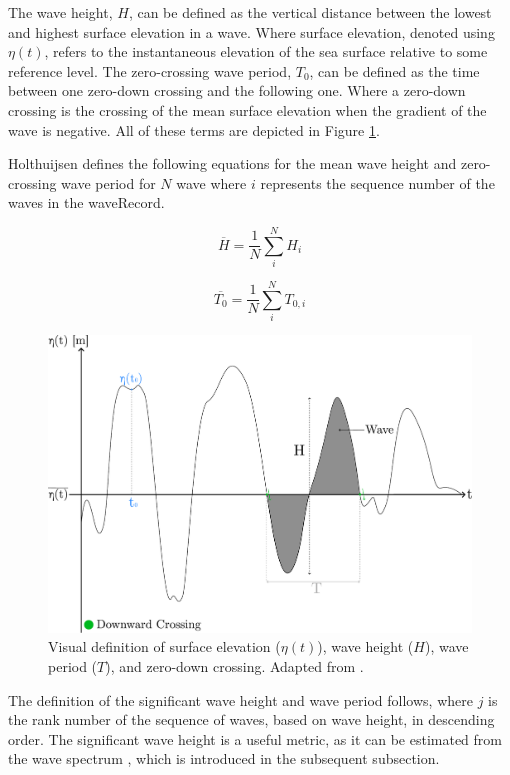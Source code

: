 The wave height, $H$, can be defined as the vertical distance between the lowest and highest surface elevation in a wave. Where surface elevation, denoted using $\eta(t)$, refers to the instantaneous elevation of the sea surface relative to some reference level. The zero-crossing wave period, $T_{0}$, can be defined as the time between one zero-down crossing and the following one. Where a zero-down crossing is the crossing of the mean surface elevation when the gradient of the wave is negative. All of these terms are depicted in Figure \ref{fig:theory.waves.introFigure}.

Holthuijsen \cite{Holthuijsen2007} defines the following equations for the mean wave height and zero-crossing wave period for $N$ wave where $i$ represents the sequence number of the waves in the \gls{waveRecord}.

\begin{equation} \label{eq:waves.mean(H)}
    \overline{H} = \frac{1}{N}\sum_{i}^{N}H_{i}
\end{equation}

\begin{equation} \label{eq:waves.mean(T0)}
    \overline{T_{0}} = \frac{1}{N}\sum_{i}^{N}T_{0,i}
\end{equation}

\begin{figure}[htbp]
    \centering
    \includegraphics[width=.75\linewidth]{Figures/Theory/surfaceElevation.pdf}
    \caption{Visual definition of surface elevation ($\eta(t)$), wave height ($H$), wave period ($T$), and zero-down crossing. Adapted from \cite{Holthuijsen2007}.}
    \label{fig:theory.waves.introFigure}
\end{figure}

The definition of the significant wave height and wave period follows, where $j$ is the rank number of the sequence of waves, based on wave height, in descending order. The significant wave height is a useful metric, as it can be estimated from the wave spectrum \cite{Holthuijsen2007}, which is introduced in the subsequent subsection.


